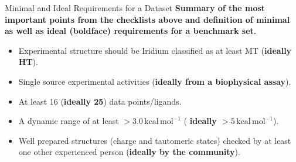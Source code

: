 \documentclass[9pt,bestpractices]{livecoms}
\def\ligcountthres{16}
\def\ligrangethres{3.0}
\begin{document}
\begin{Checklists*}[hp!]
\begin{checklist}{Minimal and Ideal Requirements for a Dataset}
\textbf{Summary of the most important points from the checklists above and definition of minimal as well as ideal (boldface) requirements for a benchmark set.}
    \begin{itemize}
        \item Experimental structure should be Iridium classified as at least MT (\textbf{ideally HT}).
        \item Single source experimental activities (\textbf{ideally from a biophysical assay}).
        \item At least \ligcountthres{} (\textbf{ideally 25}) data points/ligands.
        \item A dynamic range of at least $>\ligrangethres{}\,\mathrm{kcal\,mol^{-1}}$ ( \textbf{ideally $>5\,\mathrm{kcal\,mol^{-1}}$}).
        \item Well prepared structures (charge and tautomeric states) checked by at least one other experienced person (\textbf{ideally by the community}).
    \end{itemize}
\end{checklist}
\end{Checklists*}



\pagebreak
\end{document}
